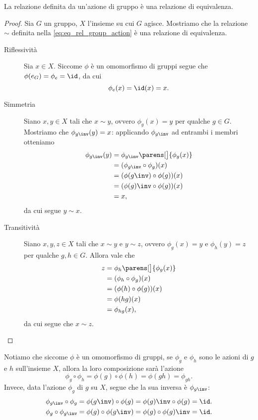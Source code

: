 \begin{proposition}
    La relazione definita da un'azione di gruppo è una relazione di equivalenza.
\end{proposition}
\begin{proof}
    Sia $G$ un gruppo, $X$ l'insieme su cui $G$ agisce. Mostriamo che la relazione $\sim$ definita nella \eqref{eq:eq_rel_group_action} è una relazione di equivalenza.
    \begin{description}
        \item[Riflessività] Sia $x \in X$. Siccome $\phi$ è un omomorfismo di gruppi segue che $\phi(e_G) = \phi_e = \id$, da cui \[
            \phi_e(x) = \id(x) = x.    
        \]
        \item[Simmetria] Siano $x, y \in X$ tali che $x \sim y$, ovvero $\phi_g(x) = y$ per qualche $g \in G$. Mostriamo che $\phi_{g\inv}(y) = x$: applicando $\phi_{g\inv}$ ad entrambi i membri otteniamo \begin{align*}
            \phi_{g\inv}(y) &= \phi_{g\inv}\parens[\big]{\phi_g(x)} \\
            &= (\phi_{g\inv} \circ \phi_g)(x)\\
            &= (\phi(g\inv) \circ \phi(g))(x)\\
            &= (\phi(g)\inv \circ \phi(g))(x)\\
            &= x,
        \end{align*} da cui segue $y \sim x$.
        \item[Transitività] Siano $x, y, z \in X$ tali che $x \sim y$ e $y \sim z$, ovvero $\phi_g(x) = y$ e $\phi_h(y) = z$ per qualche $g, h \in G$. Allora vale che \begin{align*}
            z &= \phi_h\parens[\big]{\phi_g(x)}\\
            &= (\phi_{h} \circ \phi_g)(x)\\
            &= (\phi(h) \circ \phi(g))(x)\\
            &= \phi(hg)(x)\\
            &= \phi_{hg}(x),
        \end{align*} da cui segue che $x \sim z$.
    \end{description}
\end{proof}

\begin{remark}
    Notiamo che siccome $\phi$ è un omomorfismo di gruppi, se $\phi_g$ e $\phi_h$ sono le azioni di $g$ e $h$ sull'insieme $X$, allora la loro composizione sarà l'azione \[
        \phi_g \circ \phi_h = \phi(g) \circ \phi(h) = \phi(gh) = \phi_{gh}.    
    \] Invece, data l'azione $\phi_g$ di $g$ su $X$, segue che la sua inversa è $\phi_{g\inv}$: \begin{gather*}
        \phi_{g\inv} \circ \phi_g = \phi(g\inv) \circ \phi(g) = \phi(g)\inv \circ \phi(g) = \id.\\   
        \phi_g \circ \phi_{g\inv} = \phi(g) \circ \phi(g\inv) = \phi(g) \circ \phi(g)\inv = \id.\\ 
    \end{gather*}
\end{remark}

